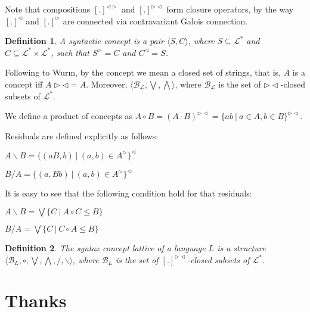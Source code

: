 \documentclass[a4paper]{article}
\theoremstyle{defin}
\newtheorem{defin}{Definition}
\theoremstyle{theorem}
\theoremstyle{prop}
\theoremstyle{lemma}
\theoremstyle{ex}
\theoremstyle{col}
\begin{document}
Note that compositions $[.]^{\triangleleft \triangleright}$ and $[.]^{\triangleright \triangleleft}$ form closure operators,
by the way $[.]^{\triangleleft}$ and $[.]^{\triangleright}$ are connected via contravariant Galois connection.

\begin{defin} A syntactic concept is a pair $\langle S, C \rangle$, where $S \subseteq \mathcal{L}^{*}$
  and $C \subseteq \mathcal{L}^{*} \times \mathcal{L}^{*}$, such that $S^{\triangleright} = C$ and $C^{\triangleleft} = S$.
\end{defin}

Following to Wurm, by the concept we mean a closed set of strings, that is, $A$ is a concept iff $A \triangleright
\triangleleft = A$. Moreover, $\langle \mathcal{B}_{\mathcal{L}}, \bigvee, \bigwedge \rangle$, where
$\mathcal{B}_{\mathcal{L}}$ is the set of $\triangleright \triangleleft$-closed subsets of $\mathcal{L}^{*}$.

We define a product of concepts as $A \circ B = (A \cdot B)^{\triangleright \triangleleft} = \{ a b \: | \: a \in A, b \in B \}^{\triangleright \triangleleft}$.

Residuals are defined explicitly as follows:

\begin{center}
  $A \backslash B = \{ (a B, b) \: | \: (a, b) \in A^{\triangleright} \}^{\triangleleft}$

  $B / A = \{ (a, B b) \: | \: (a, b) \in A^{\triangleright} \}^{\triangleleft}$
\end{center}

It is easy to see that the following condition hold for that residuals:

\begin{center}
  $A \backslash B = \bigvee \{ C \: | \: A \circ C \leq B \}$

  $B / A = \bigvee \{ C \: | \: C \circ A \leq B \}$
\end{center}

\begin{defin}
  The syntax concept lattice of a language $L$ is a structure $\langle \mathcal{B}_{L}, \circ, \bigvee, \bigwedge, /, \backslash \rangle$,
  where $\mathcal{B}_{L}$  is the set of $[.]^{\triangleright \triangleleft}$-closed subsets of $\mathcal{L}^{*}$.
\end{defin}

\section{Thanks}
\end{document}
